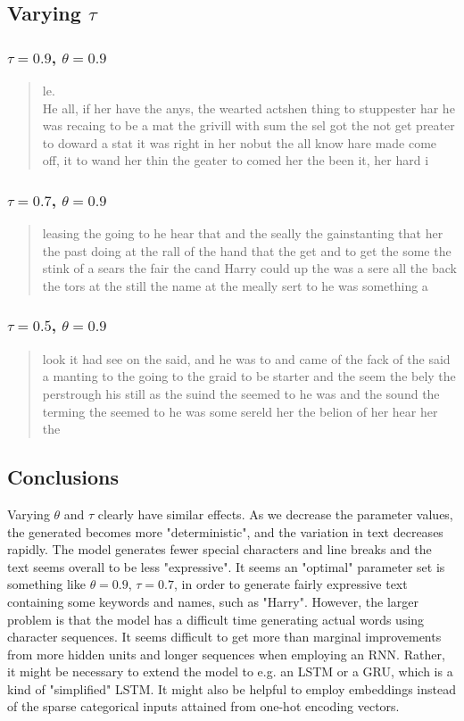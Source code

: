 \documentclass{article}
\begin{document}
\subsection*{Varying $\tau$}
\subsubsection*{$\tau=0.9$, $\theta=0.9$}
	\begin{quote}
		le.\\He all, if her have the anys, the wearted actshen thing to stuppester har he was recaing to be a mat the grivill with sum the sel got the not get preater to doward a stat it was right in her nobut the all know hare made come off, it to wand her thin the geater to comed her the been it, her hard i
	\end{quote}

\subsubsection*{$\tau=0.7$, $\theta=0.9$}
	\begin{quote}
		leasing the going to he hear that  and the seally the gainstanting that her the past doing at the rall of the hand that the get and to get the some the stink of a sears the fair the cand Harry could up the was a sere all the back the tors at the still the name at the meally sert to he was something a
	\end{quote}

\subsubsection*{$\tau=0.5$, $\theta=0.9$}
	\begin{quote}
		look it had see on the said, and he was to and came of the fack of the said a manting to the going to the graid to be starter and the seem the bely the perstrough his still as the suind the seemed to he was and the sound the terming the seemed to he was some sereld her the belion of her hear her the
	\end{quote}

\subsection*{Conclusions}
	Varying $\theta$ and $\tau$ clearly have similar effects. As we decrease the parameter values, the generated becomes more "deterministic", and the variation in text decreases rapidly. The model generates fewer special characters and line breaks and the text seems overall to be less "expressive". It seems an "optimal" parameter set is something like $\theta=0.9$, $\tau = 0.7$, in order to generate fairly expressive text containing some keywords and names, such as "Harry". However, the larger problem is that the model has a difficult time generating actual words using character sequences. It seems difficult to get more than marginal improvements from more hidden units and longer sequences when employing an RNN. Rather, it might be necessary to extend the model to e.g. an LSTM or a GRU, which is a kind of "simplified" LSTM. It might also be helpful to employ embeddings instead of the sparse categorical inputs attained from one-hot encoding vectors. 
\end{document}
